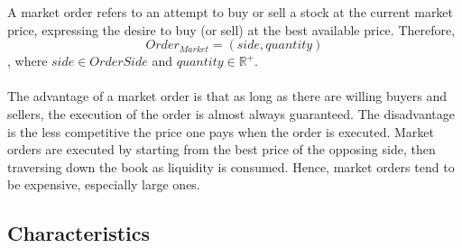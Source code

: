 A market order refers to an attempt to buy or sell a stock at the current market price, expressing the desire to buy (or sell) at the best available price. Therefore,
\begin{equation}
Order_{Market}=(side, quantity)
\end{equation}
, where $side \in OrderSide$ and $quantity \in \mathbb{R^+}$.
\\
\\
The advantage of a market order is that as long as there are willing buyers and sellers, the execution of the order is almost always guaranteed. \cite{sec-market-order}
The disadvantage is the less competitive the price one pays when the order is executed.
Market orders are executed by starting from the best price of the opposing side, then traversing down the book as liquidity is consumed. 
Hence, market orders tend to be expensive, especially large ones.

\subsection{Characteristics}
\label{sec:ob-characteristics}

